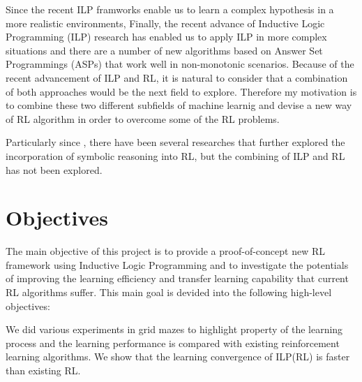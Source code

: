 Since the recent ILP framworks enable us to learn a complex hypothesis in a more realistic environments, 
Finally, the recent advance of Inductive Logic Programming (ILP) research has enabled us to apply ILP in more complex situations and there are a number of new algorithms based on Answer Set Programmings (ASPs) that work well in non-monotonic scenarios.
Because of the recent advancement of ILP and RL, it is natural to consider that a combination of both approaches would be the next field to explore.
Therefore my motivation is to combine these two different subfields of machine learnig and devise a new way of RL algorithm in order to overcome some of the RL problems.

Particularly since \cite{Garnelo2016}, there have been several researches that further explored the incorporation of symbolic reasoning into RL, but the combining of ILP and RL has not been explored. 

\section{Objectives}
\label{sec:objectives}

The main objective of this project is to provide a proof-of-concept new RL framework using Inductive Logic Programming and to investigate the potentials of improving the learning efficiency and transfer learning capability that current RL algorithms suffer.
This main goal is devided into the following high-level objectives:


We did various experiments in grid mazes to highlight property of the learning process and the learning performance is compared with existing reinforcement learning algorithms.
We show that the learning convergence of ILP(RL) is faster than existing RL. 


